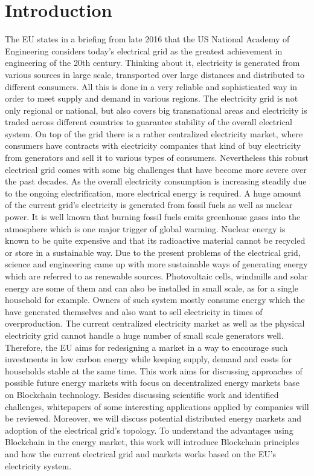 \documentclass[runningheads]{llncs}
\begin{document}
\section{Introduction}
The EU states in a briefing from late 2016 \cite{eu_energy_market} that the US National Academy of Engineering considers today's electrical grid as the greatest achievement in engineering of the 20th century. Thinking about it, electricity is generated from various sources in large scale, transported over large distances and distributed to different consumers. All this is done in a very reliable and sophisticated way in order to meet supply and demand in various regions. The electricity grid is not only regional or national, but also covers big transnational areas and electricity is traded across different countries to guarantee stability of the overall electrical system. On top of the grid there is a rather centralized electricity market, where consumers have contracts with electricity companies that kind of buy electricity from generators and sell it to various types of consumers. \newline
Nevertheless this robust electrical grid comes with some big challenges that have become more severe over the past decades. As the overall electricity consumption is increasing steadily due to the ongoing electrification, more electrical energy is required. A huge amount of the current grid's electricity is generated from fossil fuels as well as nuclear power. It is well known that burning fossil fuels emits greenhouse gases into the atmosphere which is one major trigger of global warming. Nuclear energy is known to be quite expensive and that its radioactive material cannot be recycled or store in a sustainable way. \newline
Due to the present problems of the electrical grid, science and engineering came up with more sustainable ways of generating energy which are referred to as renewable sources. Photovoltaic cells, windmills and solar energy are some of them and can also be installed in small scale, as for a single household for example. Owners of such system mostly consume energy which the have generated themselves and also want to sell electricity in times of overproduction. The current centralized electricity market as well as the physical electricity grid cannot handle a huge number of small scale generators well. Therefore, the EU \cite{eu_energy_market} aims for redesigning a market in a way to encourage such investments in low carbon energy while keeping supply, demand and costs for households stable at the same time. \newline
This work aims for discussing approaches of possible future energy markets with focus on decentralized energy markets base on Blockchain technology. Besides discussing scientific work and identified challenges, whitepapers of some interesting applications applied by companies will be reviewed. Moreover, we will discuss potential distributed energy markets and adoption of the electrical grid's topology. To understand the advantages using Blockchain in the energy market, this work will introduce Blockchain principles and how the current electrical grid and markets works based on the EU's electricity system.
\end{document}
